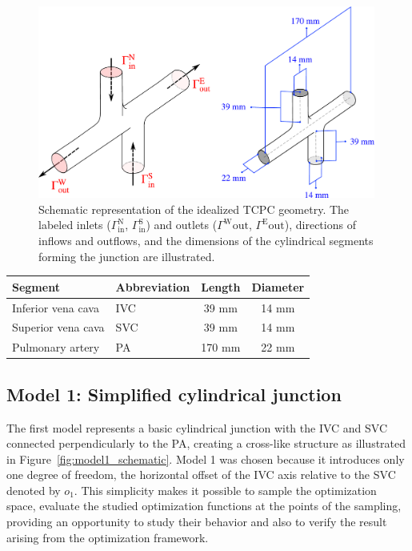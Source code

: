 \begin{figure}[H]
	\centering
	\vspace{2mm}
	\includegraphics[width=0.99\textwidth]{figures/3d-tcpc-schema-combined.pdf}
	\vspace{7mm}
	\caption{Schematic representation of the idealized TCPC geometry. The labeled inlets ($\Gamma^{\text{N}}_{\text{in}}$, $\Gamma^{\text{S}}_{\text{in}}$) and outlets ($\Gamma^{\text{W}}{\text{out}}$, $\Gamma^{\text{E}}{\text{out}}$), directions of inflows and outflows, and the dimensions of the cylindrical segments forming the junction are illustrated.}
	\label{fig:junction schema}
\end{figure}

\bgroup
\centering
\vspace{2mm}
\setlength\tabcolsep{3mm}
\def\arraystretch{1.7}%
\begin{tabular}{|l|l|c|c|}
	\hline
	Segment & Abbreviation & Length & Diameter \\ \hline
	Inferior vena cava 	& IVC 	&      39 mm        &     14 mm    \\ 
	Superior vena cava  & SVC 	&      39 mm     	&     14 mm     \\ 
	Pulmonary artery 	& PA 	&      170 mm     	&     22 mm     \\  \hline
\end{tabular}
\vspace{2mm}
\label{tab:tcpc dims}
\egroup

\subsection*{Model 1: Simplified cylindrical junction}
The first model represents a basic cylindrical junction with the IVC and SVC connected perpendicularly to the PA, creating a cross-like structure as illustrated in Figure~\ref{fig:model1_schematic}. Model 1 was chosen because it introduces only one degree of freedom, the horizontal offset of the IVC axis relative to the SVC denoted by $o_1$. This simplicity makes it possible to sample the optimization space, evaluate the studied optimization functions at the points of the sampling, providing an opportunity to study their behavior and also to verify the result arising from the optimization framework.

